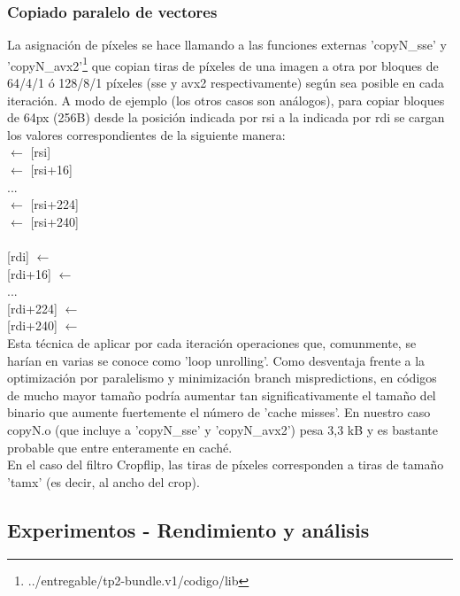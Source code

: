 \subsubsection{Copiado paralelo de vectores}
\label{explicacionCopyN}

La asignación de píxeles se hace llamando a las funciones externas 'copyN_sse' y 'copyN_avx2'\footnote{../entregable/tp2-bundle.v1/codigo/lib} que copian tiras de píxeles de una imagen a otra por bloques de 64/4/1 ó 128/8/1 píxeles (sse y avx2 respectivamente) según sea posible en cada iteración. A modo de ejemplo (los otros casos son análogos), para copiar bloques de 64px (256B) desde la posición indicada por rsi a la indicada por rdi se cargan los valores correspondientes de la siguiente manera:
\newline
\\
 $\leftarrow$ {[rsi]} \\
 $\leftarrow$ {[rsi+16]} \\
... \\
 $\leftarrow$ {[rsi+224]}  \\
 $\leftarrow$ {[rsi+240]} \\
\\
{[rdi]} $\leftarrow$  \\
{[rdi+16]} $\leftarrow$  \\
... \\
{[rdi+224]} $\leftarrow$  \\
{[rdi+240]} $\leftarrow$  \\

Esta técnica de aplicar por cada iteración operaciones que, comunmente, se harían en varias se conoce como 'loop unrolling'. Como desventaja frente a la optimización por paralelismo y minimización branch mispredictions, en códigos de mucho mayor tamaño podría aumentar tan significativamente el tamaño del binario que aumente fuertemente el número de 'cache misses'. En nuestro caso copyN.o (que incluye a 'copyN_sse' y 'copyN_avx2') pesa 3,3 kB y es bastante probable que entre enteramente en caché.
\\

En el caso del filtro Cropflip, las tiras de píxeles corresponden a tiras de tamaño 'tamx' (es decir, al ancho del crop).  


\subsection{Experimentos - Rendimiento y análisis}


